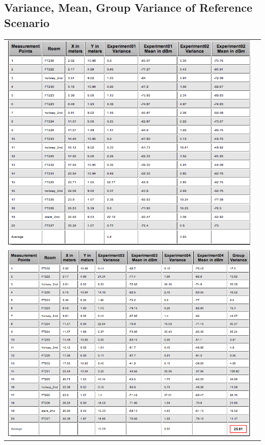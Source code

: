 \documentclass[11pt,a4paper,headinclude,footinclude,chapterprefix=on]{scrreprt}
\begin{document}
\subsection{Variance, Mean, Group Variance of Reference Scenario} 
\begin{longtable}
	{lr} 
	\includegraphics[width=15cm]{../../Source/plot/data/63_ref1.png} \\
	\includegraphics[width=15cm]{../../Source/plot/data/63_ref2.png} \\
\end{longtable}
\end{document}
